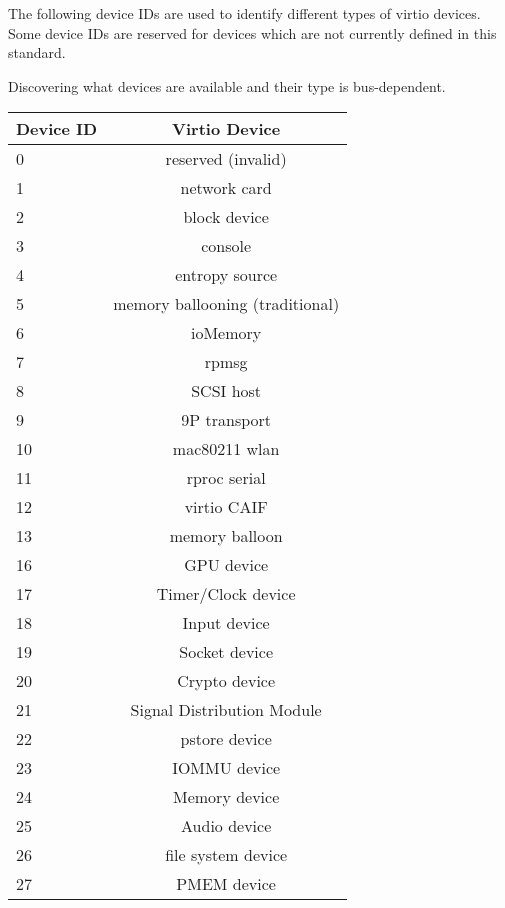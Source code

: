 The following device IDs are used to identify different types of virtio
devices.  Some device IDs are reserved for devices which are not currently
defined in this standard.

Discovering what devices are available and their type is bus-dependent.

\begin{tabular} { |l|c| }
\hline
Device ID  &  Virtio Device    \\
\hline \hline
0          & reserved (invalid) \\
\hline
1          &   network card     \\
\hline
2          &   block device     \\
\hline
3          &      console       \\
\hline
4          &  entropy source    \\
\hline
5          & memory ballooning (traditional)  \\
\hline
6          &     ioMemory       \\
\hline
7          &       rpmsg        \\
\hline
8          &     SCSI host      \\
\hline
9          &   9P transport     \\
\hline
10         &   mac80211 wlan    \\
\hline
11         &   rproc serial     \\
\hline
12         &   virtio CAIF      \\
\hline
13         &  memory balloon    \\
\hline
16         &   GPU device       \\
\hline
17         &   Timer/Clock device \\
\hline
18         &   Input device \\
\hline
19         &   Socket device \\
\hline
20         &   Crypto device \\
\hline
21         &   Signal Distribution Module \\
\hline
22         &   pstore device \\
\hline
23         &   IOMMU device \\
\hline
24         &   Memory device \\
\hline
25         &   Audio device \\
\hline
26         &   file system device \\
\hline
27         &   PMEM device \\

\end{tabular}
